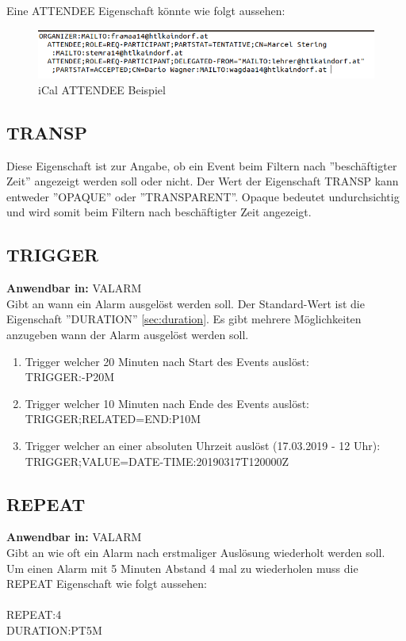 Eine ATTENDEE Eigenschaft könnte wie folgt aussehen: \\
\begin{figure}[h]
	\centering
    \includegraphics[width=\textwidth]{images/iCal_Format_attendee}
    \caption{iCal ATTENDEE Beispiel}
    \label{fig:netFramework}
\end{figure}
\subsection{TRANSP}
\label{sec:transp}
Diese Eigenschaft ist zur Angabe, ob ein Event beim Filtern nach ''beschäftigter Zeit'' angezeigt werden soll oder nicht. Der Wert der Eigenschaft TRANSP kann entweder ''OPAQUE'' oder ''TRANSPARENT''. Opaque bedeutet undurchsichtig und wird somit beim Filtern nach beschäftigter Zeit angezeigt.
\subsection{TRIGGER}
\label{sec:trigger}
\textbf{Anwendbar in:} VALARM \\
Gibt an wann ein Alarm ausgelöst werden soll. Der Standard-Wert ist die Eigenschaft ''DURATION'' \ref{sec:duration}. Es gibt mehrere Möglichkeiten anzugeben wann der Alarm ausgelöst werden soll. 
\begin{enumerate}
\item Trigger welcher 20 Minuten nach Start des Events auslöst: \\TRIGGER:-P20M\\
\item Trigger welcher 10 Minuten nach Ende des Events auslöst: \\TRIGGER;RELATED=END:P10M\\
\item Trigger welcher an einer absoluten Uhrzeit auslöst (17.03.2019 - 12 Uhr): \\TRIGGER;VALUE=DATE-TIME:20190317T120000Z\\
\end{enumerate}
\subsection{REPEAT}
\label{sec:repeat}
\textbf{Anwendbar in:} VALARM \\
Gibt an wie oft ein Alarm nach erstmaliger Auslösung wiederholt werden soll. Um einen Alarm mit 5 Minuten Abstand 4 mal zu wiederholen muss die REPEAT Eigenschaft wie folgt aussehen: \\ \\ REPEAT:4\\DURATION:PT5M
